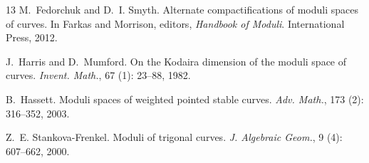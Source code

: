 \documentclass{amsart}
\begin{document}
\begin{thebibliography}{13}
M.~Fedorchuk and D.~I. Smyth.
\newblock Alternate compactifications of moduli spaces of curves.
\newblock In Farkas and Morrison, editors, \emph{Handbook of Moduli}.
  International Press, 2012.

J.~Harris and D.~Mumford.
\newblock On the {K}odaira dimension of the moduli space of curves.
\newblock \emph{Invent. Math.}, 67 (1): 23--88, 1982.

B.~Hassett.
\newblock Moduli spaces of weighted pointed stable curves.
\newblock \emph{Adv. Math.}, 173 (2): 316--352, 2003.

Z.~E. Stankova-Frenkel.
\newblock Moduli of trigonal curves.
\newblock \emph{J. Algebraic Geom.}, 9 (4): 607--662, 2000.

\end{thebibliography}
\end{document}
